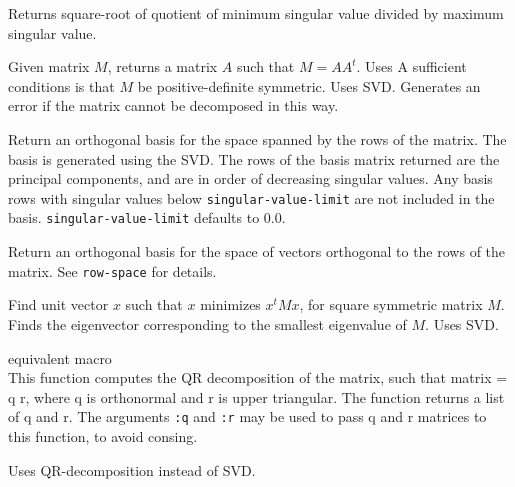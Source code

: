 \begin{description}
\item{}
Returns square-root of quotient of minimum singular value divided by
maximum singular value.

\item{}
Given matrix $M$, returns a matrix $A$ such that $M = A A^t$.  Uses A
sufficient conditions is that $M$ be positive-definite symmetric. Uses
SVD.  Generates an error if the matrix cannot be decomposed in this
way.

\item{}
Return an orthogonal basis for the space spanned by the rows of the
matrix. The basis is generated using the SVD. The rows
of the basis matrix returned are the principal components,
and are in order of decreasing singular values. 
Any basis rows with singular values below {\tt singular-value-limit} 
are not included in the basis. {\tt singular-value-limit} defaults to 0.0.

\item{}
Return an orthogonal basis for the space of vectors
orthogonal to the rows of the matrix.
See {\tt row-space} for details.

\item{}

\item{}

\item{}
Find unit vector $x$ such that $x$ minimizes $x^t M x$, for square
symmetric matrix $M$.  Finds the eigenvector corresponding to the
smallest eigenvalue of $M$.  Uses SVD.

\item{}
equivalent macro  \\ This function computes the QR
decomposition of the matrix, such that matrix = q r, where q is
orthonormal and r is upper triangular.  The function returns a list of
q and r.  The arguments {\tt :q} and {\tt :r} may be used to pass q
and r matrices to this function, to avoid consing.

\item{}
Uses QR-decomposition instead of SVD.


\end{description}
